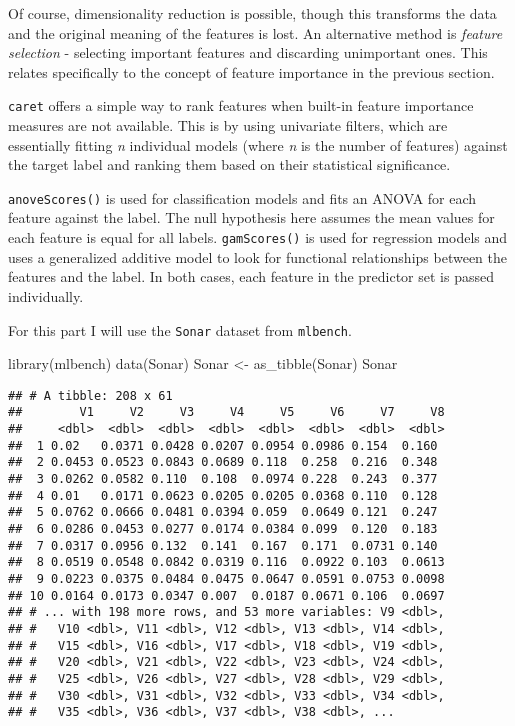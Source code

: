 \documentclass[
]{book}
\newenvironment{Shaded}{\begin{snugshade}}{\end{snugshade}}
\newcommand{\FunctionTok}[1]{\textcolor[rgb]{0.00,0.00,0.00}{#1}}
\newcommand{\NormalTok}[1]{#1}
\newcommand{\OtherTok}[1]{\textcolor[rgb]{0.56,0.35,0.01}{#1}}
\begin{document}
Of course, dimensionality reduction is possible, though this transforms the data and the original meaning of the features is lost. An alternative method is \emph{feature selection} - selecting important features and discarding unimportant ones. This relates specifically to the concept of feature importance in the previous section.

\texttt{caret} offers a simple way to rank features when built-in feature importance measures are not available. This is by using univariate filters, which are essentially fitting \emph{n} individual models (where \emph{n} is the number of features) against the target label and ranking them based on their statistical significance.

\texttt{anoveScores()} is used for classification models and fits an ANOVA for each feature against the label. The null hypothesis here assumes the mean values for each feature is equal for all labels. \texttt{gamScores()} is used for regression models and uses a generalized additive model to look for functional relationships between the features and the label. In both cases, each feature in the predictor set is passed individually.

For this part I will use the \texttt{Sonar} dataset from \texttt{mlbench}.

\begin{Shaded}
\begin{Highlighting}[]
\FunctionTok{library}\NormalTok{(mlbench)}
\FunctionTok{data}\NormalTok{(Sonar)}
\NormalTok{Sonar }\OtherTok{\textless{}{-}} \FunctionTok{as\_tibble}\NormalTok{(Sonar)}
\NormalTok{Sonar}
\end{Highlighting}
\end{Shaded}

\begin{verbatim}
## # A tibble: 208 x 61
##        V1     V2     V3     V4     V5     V6     V7     V8
##     <dbl>  <dbl>  <dbl>  <dbl>  <dbl>  <dbl>  <dbl>  <dbl>
##  1 0.02   0.0371 0.0428 0.0207 0.0954 0.0986 0.154  0.160 
##  2 0.0453 0.0523 0.0843 0.0689 0.118  0.258  0.216  0.348 
##  3 0.0262 0.0582 0.110  0.108  0.0974 0.228  0.243  0.377 
##  4 0.01   0.0171 0.0623 0.0205 0.0205 0.0368 0.110  0.128 
##  5 0.0762 0.0666 0.0481 0.0394 0.059  0.0649 0.121  0.247 
##  6 0.0286 0.0453 0.0277 0.0174 0.0384 0.099  0.120  0.183 
##  7 0.0317 0.0956 0.132  0.141  0.167  0.171  0.0731 0.140 
##  8 0.0519 0.0548 0.0842 0.0319 0.116  0.0922 0.103  0.0613
##  9 0.0223 0.0375 0.0484 0.0475 0.0647 0.0591 0.0753 0.0098
## 10 0.0164 0.0173 0.0347 0.007  0.0187 0.0671 0.106  0.0697
## # ... with 198 more rows, and 53 more variables: V9 <dbl>,
## #   V10 <dbl>, V11 <dbl>, V12 <dbl>, V13 <dbl>, V14 <dbl>,
## #   V15 <dbl>, V16 <dbl>, V17 <dbl>, V18 <dbl>, V19 <dbl>,
## #   V20 <dbl>, V21 <dbl>, V22 <dbl>, V23 <dbl>, V24 <dbl>,
## #   V25 <dbl>, V26 <dbl>, V27 <dbl>, V28 <dbl>, V29 <dbl>,
## #   V30 <dbl>, V31 <dbl>, V32 <dbl>, V33 <dbl>, V34 <dbl>,
## #   V35 <dbl>, V36 <dbl>, V37 <dbl>, V38 <dbl>, ...
\end{verbatim}
\end{document}
